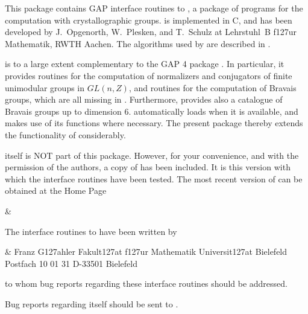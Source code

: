 

This package contains GAP interface routines to {\CARAT}, 
a package of programs for the computation with crystallographic
groups. {\CARAT} is implemented in C, and has been developed by
J.~Opgenorth, W.~Plesken, and T.~Schulz at Lehrstuhl~B f\accent127ur 
Mathematik, RWTH Aachen. The algorithms used by {\CARAT} are described 
in \cite{OPS98}. 

{\CARAT} is to a large extent complementary to the GAP 4 package
{\Cryst}. In particular, it provides routines for the computation 
of normalizers and conjugators of finite unimodular groups in $GL(n,Z)$,
and routines for the computation of Bravais groups, which are all 
missing in {\Cryst}.  Furthermore, {\CARAT} provides also a catalogue of 
Bravais groups up to dimension 6. {\Cryst} automatically loads {\CARAT}
when it is available, and makes use of its functions where necessary. 
The present package thereby extends the functionality of {\Cryst} 
considerably.

{\CARAT} itself is NOT part of this package. However, for your convenience,
and with the permission of the {\CARAT} authors, a copy of {\CARAT} 
has been included. It is this version with which the interface routines 
have been tested. The most recent version of {\CARAT} can be obtained at 
the {\CARAT} Home Page

\beginitems
&
\enditems
 
The {\GAP} interface routines to {\CARAT} have been written by

\beginitems
&
Franz G\accent127ahler\hfill\break
Fakult\accent127at f\accent127ur Mathematik\hfill\break
Universit\accent127at Bielefeld\hfill\break
Postfach 10 01 31\hfill\break
D-33501 Bielefeld\hfill\break
{}
\enditems

to whom bug reports regarding these interface routines should be
addressed. 

Bug reports regarding {\CARAT} itself should be sent to
.

